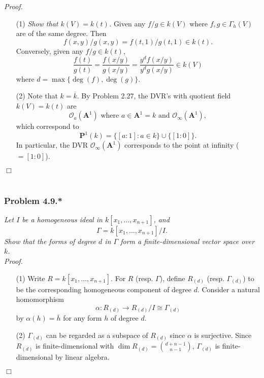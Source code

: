 \documentclass{article}
\begin{document}
\emph{Proof.}
\begin{enumerate}
\item[(1)]
  \emph{Show that $k(V) = k(t)$.}
  Given any $f/g \in k(V)$ where $f, g \in \Gamma_h(V)$ are of the same degree.
  Then
  \[
    f(x,y)/g(x,y) = f(t,1)/g(t,1) \in k(t).
  \]
  Conversely, given any $f/g \in k(t)$,
  \[
    \frac{f(t)}{g(t)} = \frac{f(x/y)}{g(x/y)} = \frac{y^d f(x/y)}{y^d g(x/y)} \in k(V)
  \]
  where $d = \max\{ \deg(f), \deg(g) \}$.

\item[(2)]
  Note that $k = \overline{k}$.
  By Problem 2.27,
  the DVR's with quotient field $k(V) = k(t)$ are
  \[
    \text{$\mathscr{O}_a(\mathbf{A}^1)$ where $a \in \mathbf{A}^1 = k$ and
    $\mathscr{O}_{\infty}(\mathbf{A}^1)$},
  \]
  which correspond to
  \[
    \mathbf{P}^1(k) = \{ [a:1] : a \in k \} \cup \{ [1:0] \}.
  \]
  In particular, the DVR $\mathscr{O}_{\infty}(\mathbf{A}^1)$ corresponds
  to the point at infinity ($= [1:0]$).
\end{enumerate}
$\Box$ \\\\






\subsubsection*{Problem 4.9.*}
\emph{Let $I$ be a homogeneous ideal in $k[x_1, \ldots, x_{n+1}]$,
and
\[
  \Gamma = k[x_1, \ldots, x_{n+1}]/I.
\]
Show that the forms of degree $d$ in $\Gamma$ form a finite-dimensional vector space over $k$.} \\



\emph{Proof.}
\begin{enumerate}
\item[(1)]
  Write $R = k[x_1, \ldots, x_{n+1}]$.
  For $R$ (resp. $\Gamma$),
  define $R_{(d)}$ (resp. $\Gamma_{(d)}$) to be the corresponding homogeneous component of degree $d$.
  Consider a natural homomorphism
  \[
    \alpha: R_{(d)} \to R_{(d)}/I \cong \Gamma_{(d)}
  \]
  by $\alpha(h) = \overline{h}$ for any form $h$ of degree $d$.

\item[(2)]
  $\Gamma_{(d)}$ can be regarded as a subspace of $R_{(d)}$ since $\alpha$ is surjective.
  Since $R_{(d)}$ is finite-dimensional with $\dim R_{(d)} = {d+n-1 \choose n-1}$,
  $\Gamma_{(d)}$ is finite-dimensional by linear algebra.
\end{enumerate}
$\Box$ \\\\
\end{document}
